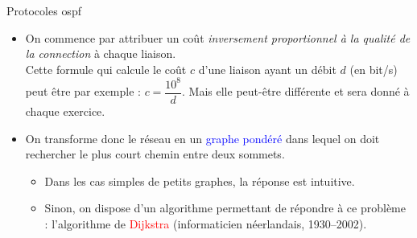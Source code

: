 \documentclass[10pt]{beamer}
\begin{document}
\begin{frame}
	\mframe{\Reseau}
	\begin{alertblock}{Protocoles {\sc ospf}}
		\begin{itemize}
			\item<1-> On commence par attribuer un coût \textit{inversement proportionnel à la qualité de la connection} à chaque liaison.\\
			      \onslide<2-> Cette formule qui calcule le coût $c$ d'une liaison ayant un débit $d$ (en bit/s) peut être par exemple :
			      \onslide<3-> $c = \dfrac{10^8}{d}$. Mais elle peut-être différente et sera donné à chaque exercice.
			\item<4-> On transforme donc le réseau en un \textcolor{blue}{graphe pondéré} dans lequel on doit rechercher le plus court chemin entre deux sommets.
			      \begin{itemize}
				      \item<5-> Dans les cas simples de petits graphes, la réponse est intuitive.
				      \item<6-> Sinon, on dispose d'un algorithme permettant de répondre à ce problème : l'algorithme de \textcolor{red}{Dijkstra} (informaticien néerlandais, 1930--2002).
			      \end{itemize}
		\end{itemize}
	\end{alertblock}
\end{frame}
\end{document}
